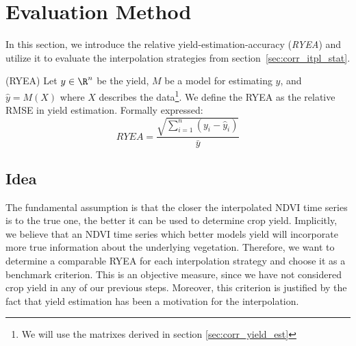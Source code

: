 \section{Evaluation Method}{
    \label{sec:ndvi_corr_eval}
    In this section, we introduce the relative yield-estimation-accuracy (\textit{RYEA}) and utilize it to evaluate the interpolation strategies from section~\ref{sec:corr_itpl_stat}. 

    \begin{definition}(RYEA) 
        Let $y\in \R^n$ be the yield, $M$ be a model for estimating $y$, and $\hat y = M(X)$ where $X$ describes the data\footnote{We will use the matrixes derived in section \ref{sec:corr_yield_est}}. 
        We define the RYEA as the relative RMSE in yield estimation. Formally expressed:
        \begin{equation}
            RYEA = \frac{\sqrt{\sum_{i=1}^n(y_i - \hat y_i)}}{\bar y}
        \end{equation}
        \label{def:ryea}
    \end{definition}

    \subsection{Idea}{
        The fundamental assumption is that the closer the interpolated NDVI time series is to the true one, the better it can be used to determine crop yield. Implicitly, we believe that an NDVI time series which better models yield will incorporate more true information about the underlying vegetation. 
        Therefore, we want to determine a comparable RYEA for each interpolation strategy and choose it as a benchmark criterion. 
        This is an objective measure, since we have not considered crop yield in any of our previous steps. Moreover, this criterion is justified by the fact that yield estimation has been a motivation for the interpolation.
    }

}
